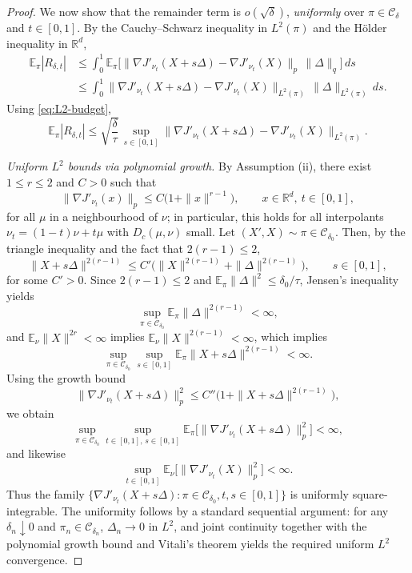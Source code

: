 \documentclass[11pt]{article}
\theoremstyle{definition}
\newcommand{\R}{\mathbb{R}}
\newcommand{\E}{\mathbb{E}}
\begin{document}
\begin{proof}
We now show that the remainder term is $o(\sqrt{\delta})$, \emph{uniformly} over
$\pi\in\mathcal{C}_\delta$ and $t\in[0,1]$. By the Cauchy--Schwarz inequality in $L^2(\pi)$ and the H\"older inequality in $\R^d$,
\begin{align*}
  \E_\pi|R_{\delta,t}|
  &\le \int_0^1
       \E_\pi\big[
         \|\nabla J'_{\nu_t}(X+s\Delta)-\nabla J'_{\nu_t}(X)\|_p\,\|\Delta\|_q
       \big]\,ds\\
  &\le \int_0^1
       \big\|\nabla J'_{\nu_t}(X+s\Delta)-\nabla J'_{\nu_t}(X)\big\|_{L^2(\pi)}
       \,\|\Delta\|_{L^2(\pi)}\,ds.
\end{align*}
Using \eqref{eq:L2-budget},
\[
  \E_\pi|R_{\delta,t}|
  \le \sqrt{\frac{\delta}{\tau}}\,
       \sup_{s\in[0,1]}
       \big\|\nabla J'_{\nu_t}(X+s\Delta)-\nabla J'_{\nu_t}(X)\big\|_{L^2(\pi)}.
\]

\smallskip
\emph{Uniform $L^2$ bounds via polynomial growth.}
By Assumption (ii), there exist $1\le r\le 2$ and $C>0$ such that
\[
  \|\nabla J'_{\nu_t}(x)\|_p \le C\big(1+\|x\|^{r-1}\big),
  \qquad x\in\R^d,\ t\in[0,1],
\]
for all $\mu$ in a neighbourhood of $\nu$; in particular, this holds for all interpolants
$\nu_t=(1-t)\nu+t\mu$ with $D_c(\mu,\nu)$ small. Let $(X',X)\sim\pi\in\mathcal{C}_{\delta_0}$.
Then, by the triangle inequality and the fact that $2(r-1)\le 2$,
\[
  \|X+s\Delta\|^{2(r-1)}
  \le C'\big(\|X\|^{2(r-1)} + \|\Delta\|^{2(r-1)}\big),
  \qquad s\in[0,1],
\]
for some $C'>0$. Since $2(r-1)\le 2$ and $\E_\pi\|\Delta\|^2\le\delta_0/\tau$, Jensen's
inequality yields
\[
  \sup_{\pi\in\mathcal{C}_{\delta_0}}\E_\pi\|\Delta\|^{2(r-1)} < \infty,
\]
and $\E_\nu\|X\|^{2r}<\infty$ implies $\E_\nu\|X\|^{2(r-1)}<\infty$, which implies 
\[
  \sup_{\pi\in\mathcal{C}_{\delta_0}}
  \sup_{s\in[0,1]}
  \E_\pi\|X+s\Delta\|^{2(r-1)}
  <\infty.
\]
Using the growth bound
\[
  \|\nabla J'_{\nu_t}(X+s\Delta)\|_p^2
  \le C''\big(1+\|X+s\Delta\|^{2(r-1)}\big),
\]
we obtain
\[
  \sup_{\pi\in\mathcal{C}_{\delta_0}}
  \sup_{t\in[0,1],\,s\in[0,1]}
  \E_\pi\big[\|\nabla J'_{\nu_t}(X+s\Delta)\|_p^2\big]
  <\infty,
\]
and likewise
\[
  \sup_{t\in[0,1]}
  \E_\nu\big[\|\nabla J'_{\nu_t}(X)\|_p^2\big] <\infty.
\]
Thus the family $\{\nabla J'_{\nu_t}(X+s\Delta): \pi\in\mathcal{C}_{\delta_0}, t,s\in[0,1]\}$
is uniformly square-integrable. The uniformity follows by a standard sequential argument: for any
$\delta_n\downarrow0$ and $\pi_n\in\mathcal{C}_{\delta_n}$,
$\Delta_n\to0$ in $L^2$, and joint continuity together with the
polynomial growth bound and Vitali's theorem yields the required
uniform $L^2$ convergence.


\end{proof}
\end{document}
